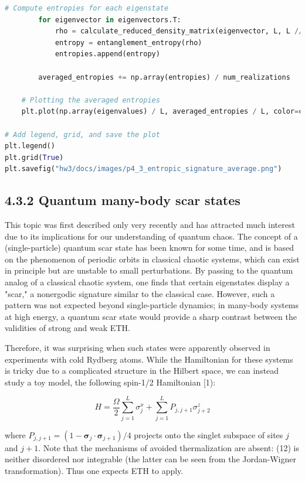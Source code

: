\documentclass[12pt]{article}
\begin{document}
\begin{lstlisting}[language=Python]
        # Compute entropies for each eigenstate
        for eigenvector in eigenvectors.T:
            rho = calculate_reduced_density_matrix(eigenvector, L, L // 2)
            entropy = entanglement_entropy(rho)
            entropies.append(entropy)

        averaged_entropies += np.array(entropies) / num_realizations

    # Plotting the averaged entropies
    plt.plot(np.array(eigenvalues) / L, averaged_entropies / L, color=colors[i], label=f'L={L}')

# Add legend, grid, and save the plot
plt.legend()
plt.grid(True)
plt.savefig("hw3/docs/images/p4_3_entropic_signature_average.png")

\end{lstlisting}
\newpage


\subsection*{4.3.2 Quantum many-body scar states}

This topic was first described only very recently and has attracted much interest due to its implications for our understanding of quantum chaos. The concept of a (single-particle) quantum scar state has been known for some time, and is based on the phenomenon of periodic orbits in classical chaotic systems, which can exist in principle but are unstable to small perturbations. By passing to the quantum analog of a classical chaotic system, one finds that certain eigenstates display a "scar," a nonergodic signature similar to the classical case. However, such a pattern was not expected beyond single-particle dynamics; in many-body systems at high energy, a quantum scar state would provide a sharp contrast between the validities of strong and weak ETH.

Therefore, it was surprising when such states were apparently observed in experiments with cold Rydberg atoms. While the Hamiltonian for these systems is tricky due to a complicated structure in the Hilbert space, we can instead study a toy model, the following spin-1/2 Hamiltonian [1):


\begin{equation*}
H=\frac{\Omega}{2} \sum_{j=1}^{L} \sigma_{j}^{x}+\sum_{j=1}^{L} P_{j, j+1} \sigma_{j+2}^{z} \tag{12}
\end{equation*}


where $P_{j, j+1}=\left(1-\boldsymbol{\sigma}_{j} \cdot \boldsymbol{\sigma}_{j+1}\right) / 4$ projects onto the singlet subspace of sites $j$ and $j+1$. Note that the mechanisms of avoided thermalization are absent: (12) is neither disordered nor integrable (the latter can be seen from the Jordan-Wigner transformation). Thus one expects ETH to apply.
\end{document}
